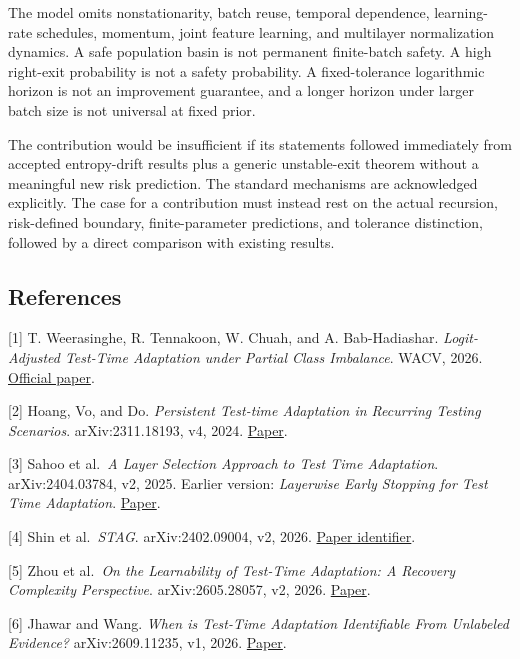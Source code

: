 The model omits nonstationarity, batch reuse, temporal dependence,
learning-rate schedules, momentum, joint feature learning, and
multilayer normalization dynamics. A safe population basin is not
permanent finite-batch safety. A high right-exit probability is not a
safety probability. A fixed-tolerance logarithmic horizon is not an
improvement guarantee, and a longer horizon under larger batch size is
not universal at fixed prior.

The contribution would be insufficient if its statements followed
immediately from accepted entropy-drift results plus a generic
unstable-exit theorem without a meaningful new risk prediction. The
standard mechanisms are acknowledged explicitly. The case for a
contribution must instead rest on the actual recursion, risk-defined
boundary, finite-parameter predictions, and tolerance distinction,
followed by a direct comparison with existing results.

\subsection{References}\label{draft-references}

{[}1{]} T. Weerasinghe, R. Tennakoon, W. Chuah, and A. Bab-Hadiashar.
\emph{Logit-Adjusted Test-Time Adaptation under Partial Class
Imbalance}. WACV, 2026.
\href{https://openaccess.thecvf.com/content/WACV2026/papers/Weerasinghe_Logit-Adjusted_Test-Time_Adaptation_under_Partial_Class_Imbalance_WACV_2026_paper.pdf}{Official
paper}.

{[}2{]} Hoang, Vo, and Do. \emph{Persistent Test-time Adaptation in
Recurring Testing Scenarios}. arXiv:2311.18193, v4, 2024.
\href{https://arxiv.org/abs/2311.18193}{Paper}.

{[}3{]} Sahoo et al.~\emph{A Layer Selection Approach to Test Time
Adaptation}. arXiv:2404.03784, v2, 2025. Earlier version:
\emph{Layerwise Early Stopping for Test Time Adaptation}.
\href{https://arxiv.org/abs/2404.03784}{Paper}.

{[}4{]} Shin et al.~\emph{STAG}. arXiv:2402.09004, v2, 2026.
\href{https://arxiv.org/abs/2402.09004}{Paper identifier}.

{[}5{]} Zhou et al.~\emph{On the Learnability of Test-Time Adaptation: A
Recovery Complexity Perspective}. arXiv:2605.28057, v2, 2026.
\href{https://arxiv.org/abs/2605.28057}{Paper}.

{[}6{]} Jhawar and Wang. \emph{When is Test-Time Adaptation Identifiable
From Unlabeled Evidence?} arXiv:2609.11235, v1, 2026.
\href{https://arxiv.org/abs/2609.11235}{Paper}.

